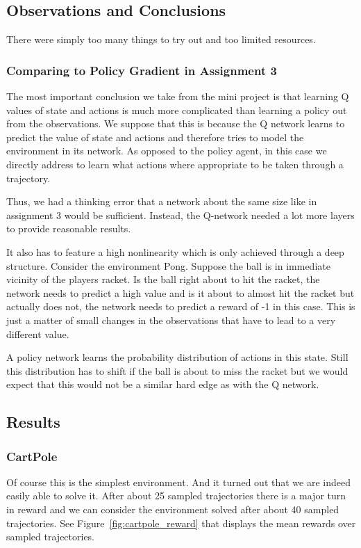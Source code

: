 \subsection{Observations and Conclusions}
There were simply too many things to try out and too limited resources.

\subsubsection{Comparing to Policy Gradient in Assignment 3}
The most important conclusion we take from the mini project is that learning Q values of state and actions is much more complicated than learning a policy out from the observations. We suppose that this is because the Q network learns to predict the value of state and actions and therefore tries to model the environment in its network. As opposed to the policy agent, in this case we directly address to learn what actions where appropriate to be taken through a trajectory.

Thus, we had a thinking error that a network about the same size like in assignment 3 would be sufficient. Instead, the Q-network needed a lot more layers to provide reasonable results.

It also has to feature a high nonlinearity which is only achieved through a deep structure. Consider the environment Pong. Suppose the ball is in immediate vicinity of the players racket. Is the ball right about to hit the racket, the network needs to predict a high value and is it about to almost hit the racket but actually does not, the network needs to predict a reward of -1 in this case. This is just a matter of small changes in the observations that have to lead to a very different value.

A policy network learns the probability distribution of actions in this state. Still this distribution has to shift if the ball is about to miss the racket but we would expect that this would not be a similar hard edge as with the Q network.

\subsection{Results}

\subsubsection{CartPole}
Of course this is the simplest environment. And it turned out that we are indeed easily able to solve it. After about 25 sampled trajectories there is a major turn in reward and we can consider the environment solved after about 40 sampled trajectories. See Figure~\ref{fig:cartpole_reward} that displays the mean rewards over sampled trajectories.

